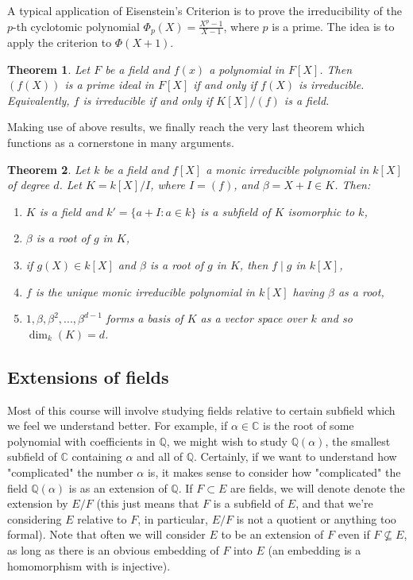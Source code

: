\documentclass[12pt]{article}
\newtheorem{thm}{Theorem}[section]
\theoremstyle{definition}
\theoremstyle{definition}
\def\CC{\mathbb{C}}
\def\QQ{\mathbb{Q}}
\begin{document}
A typical application of Eisenstein's Criterion is to prove the irreducibility of the $p$-th cyclotomic polynomial $\Phi_p(X) = \frac{X^p-1}{X-1}$, where $p$ is a prime. The idea is to apply the criterion to $\Phi(X+1)$.

\begin{thm}
    Let $F$ be a field and $f(x)$ a polynomial in $F[X]$. Then $(f(X))$ is a prime ideal in $F[X]$ if and only if $f(X)$ is irreducible. Equivalently, $f$ is irreducible if and only if $K[X]/(f)$ is a field.
\end{thm}

Making use of above results, we finally reach the very last theorem which functions as a cornerstone in many arguments.

\begin{thm}
    Let $k$ be a field and $f[X]$ a monic irreducible polynomial in $k[X]$ of degree $d$. Let $K=k[X]/I$, where $I=(f)$, and $\beta = X+I\in K$. Then:
    \begin{enumerate}
        \item $K$ is a field and $k'=\{a+I: a\in k\}$ is a subfield of $K$ isomorphic to $k$,
        \item $\beta$ is a root of $g$ in $K$,
        \item if $g(X)\in k[X]$ and $\beta$ is a root of $g$ in $K$, then $f\mid g$ in $k[X]$,
        \item $f$ is the unique monic irreducible polynomial in $k[X]$ having $\beta$ as a root,
        \item $1,\beta,\beta^2,...,\beta^{d-1}$ forms a basis of $K$ as a vector space over $k$ and so $\dim_k(K)=d$.
    \end{enumerate}
\end{thm}

\subsection{Extensions of fields}

Most of this course will involve studying fields relative to certain subfield which we feel we understand better. For example, if $\alpha\in\CC$ is the root of some polynomial with coefficients in $\QQ$, we might wish to study $\QQ(\alpha)$, the smallest subfield of $\CC$ containing $\alpha$ and all of $\QQ$. Certainly, if we want to understand how "complicated" the number $\alpha$ is, it makes sense to consider how "complicated" the field $\QQ(\alpha)$ is as an extension of $\QQ$. If $F \subset E$ are fields, we will denote denote the extension by $E/F$ (this just means that $F$ is a subfield of $E$, and that we're considering $E$ relative to $F$, in particular, $E/F$ is not a quotient or anything too formal). Note that often we will consider $E$ to be an extension of $F$ even if $F\nsubseteq E$, as long as there is an obvious embedding of $F$ into $E$ (an embedding is a homomorphism with is injective). 
\end{document}
